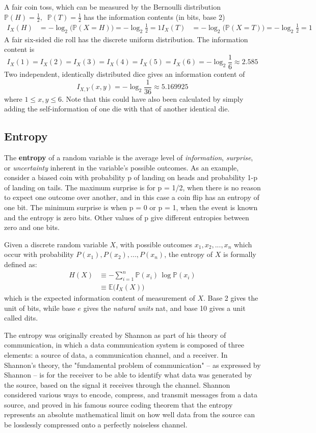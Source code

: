 \documentclass[a4paper, 12pt]{report}
\theoremstyle{remark}
\theoremstyle{definition}
\begin{document}
A fair coin toss, which can be measured by the Bernoulli distribution $\mathbb{P}(H) = \frac{1}{2}, \;\; \mathbb{P}(T) = \frac{1}{2}$ has the information contents (in bits, base 2) 
\begin{align*}
    I_X (H) & = - \log_2 \big( \mathbb{P}(X = H)\big) = - \log_2 \frac{1}{2} = 1 
    I_X (T) & = - \log_2 \big( \mathbb{P}(X = T)\big) = - \log_2 \frac{1}{2} = 1 
\end{align*}
A fair six-sided die roll has the discrete uniform distribution. The information content is 
\[I_X (1) = I_X (2) = I_X (3) = I_X (4) = I_X (5) = I_X (6) = -\log_2 \frac{1}{6} \approx 2.585\]
Two independent, identically distributed dice gives an information content of 
\[I_{X, Y} (x, y) = -\log_2 \frac{1}{36} \approx 5.169925\]
where $1 \leq x, y \leq 6$. Note that this could have also been calculated by simply adding the self-information of one die with that of another identical die.

\subsection{Entropy}
The \textbf{entropy} of a random variable is the average level of \textit{information}, \textit{surprise}, or \textit{uncertainty} inherent in the variable's possible outcomes. As an example, consider a biased coin with probability p of landing on heads and probability 1-p of landing on tails. The maximum surprise is for p = 1/2, when there is no reason to expect one outcome over another, and in this case a coin flip has an entropy of one bit. The minimum surprise is when p = 0 or p = 1, when the event is known and the entropy is zero bits. Other values of p give different entropies between zero and one bits.

Given a discrete random variable $X$, with possible outcomes $x_1, x_2, ..., x_n$ which occur with probability $P(x_1), P(x_2), ..., P(x_n)$, the entropy of $X$ is formally defined as: 
\begin{align*}
    H(X) & \equiv - \sum_{i=1}^n \mathbb{P}(x_i) \, \log \mathbb{P}(x_i) \\
    & \equiv \mathbb{E}\big(I_X (X)\big)
\end{align*}
which is the expected information content of measurement of $X$. Base 2 gives the unit of bits, while base $e$ gives the \textit{natural units} nat, and base 10 gives a unit called dits. 

The entropy was originally created by Shannon as part of his theory of communication, in which a data communication system is composed of three elements: a source of data, a communication channel, and a receiver. In Shannon's theory, the "fundamental problem of communication" – as expressed by Shannon – is for the receiver to be able to identify what data was generated by the source, based on the signal it receives through the channel. Shannon considered various ways to encode, compress, and transmit messages from a data source, and proved in his famous source coding theorem that the entropy represents an absolute mathematical limit on how well data from the source can be losslessly compressed onto a perfectly noiseless channel. 
\end{document}
